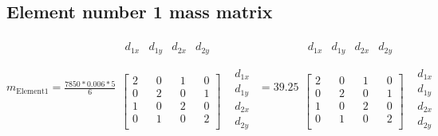 \documentclass{article}
\begin{document}
\subsection{Element number 1 mass matrix}
    \begin{math}
        m_{\text{Element1}}=\frac{7850*0.006*5}{6}
        \begin{matrix}
            \begin{matrix}
            d_{1x}&d_{1y}& d_{2x}&d_{2y}\\
            \end{matrix}\\
            \begin{bmatrix}
            2&\;\;\;0&\;\;\;1&\;\;\;0\\
            0&\;\;\;2&\;\;\;0&\;\;\;1\\
            1&\;\;\;0&\;\;\;2&\;\;\;0\\
            0&\;\;\;1&\;\;\;0&\;\;\;2\\
            \end{bmatrix}&
            \begin{matrix}
            d_{1x}\\
            d_{1y}\\
            d_{2x}\\
            d_{2y}\\
            \end{matrix}
        \end{matrix}
        =39.25
        \begin{matrix}
            \begin{matrix}
            d_{1x}&d_{1y}&d_{2x}&d_{2y}\\
            \end{matrix}\\
            \begin{bmatrix}
            2&\;\;\;0&\;\;\;1&\;\;\;0\\
            0&\;\;\;2&\;\;\;0&\;\;\;1\\
            1&\;\;\;0&\;\;\;2&\;\;\;0\\
            0&\;\;\;1&\;\;\;0&\;\;\;2\\
            \end{bmatrix}&
            \begin{matrix}
            d_{1x}\\
            d_{1y}\\
            d_{2x}\\
            d_{2y}\\
            \end{matrix}
        \end{matrix}
    \end{math}
\end{document}

